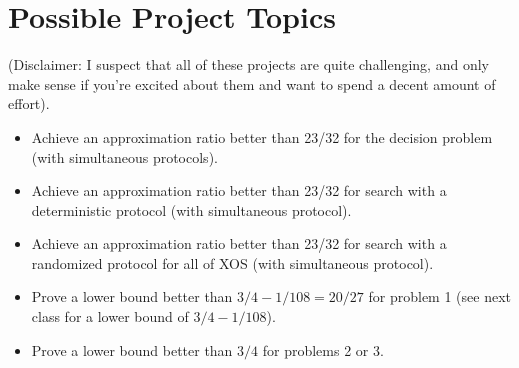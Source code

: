 \section{Possible Project Topics}
(Disclaimer: I suspect that all of these projects are quite challenging, and only make sense if you're excited about them and want to spend a decent amount of effort).
\begin{itemize}
\item Achieve an approximation ratio better than 23/32 for the decision problem (with simultaneous protocols).
\item Achieve an approximation ratio better than 23/32 for search with a deterministic protocol (with simultaneous protocol).
\item Achieve an approximation ratio better than 23/32 for search with a randomized protocol for all of XOS (with simultaneous protocol). 
\item Prove a lower bound better than $3/4-1/108 = 20/27$ for problem 1 (see next class for a lower bound of $3/4-1/108$).
\item Prove a lower bound better than $3/4$ for problems 2 or 3.
\end{itemize}





